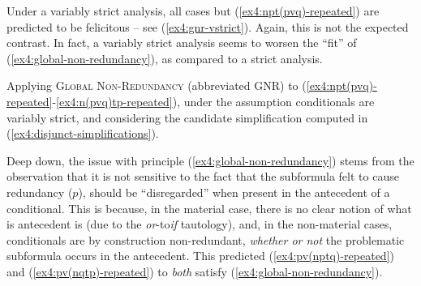 Under a variably strict analysis, all cases but (\ref{ex4:npt(pvq)-repeated}) are predicted to be felicitous -- see (\ref{ex4:gnr-vstrict}). Again, this is not the expected contrast. In fact, a variably strict analysis seems to worsen the ``fit'' of (\ref{ex4:global-non-redundancy}), as compared to a strict analysis. 

\begin{exe}
	\ex\label{ex4:gnr-vstrict} Applying \textsc{Global Non-Redundancy} (abbreviated GNR) to (\ref{ex4:npt(pvq)-repeated}-\ref{ex4:n(pvq)tp-repeated}), under the assumption conditionals are variably strict, and considering the candidate simplification computed in (\ref{ex4:disjunct-simplifications}). 
	\begin{xlist}
		\end{xlist}
\end{exe}


Deep down, the issue with principle (\ref{ex4:global-non-redundancy}) stems from the observation that it is not sensitive to the fact that the subformula felt to cause redundancy ($p$), should be ``disregarded'' when present in the antecedent of a conditional. This is because, in the material case, there is no clear notion of what is antecedent is (due to the \textit{or}-to\textit{if} tautology), and, in the non-material cases, conditionals are by construction non-redundant, \textit{whether or not} the problematic subformula occurs in the antecedent. This predicted (\ref{ex4:pv(nptq)-repeated}) and (\ref{ex4:pv(nqtp)-repeated}) to \textit{both} satisfy (\ref{ex4:global-non-redundancy}).


